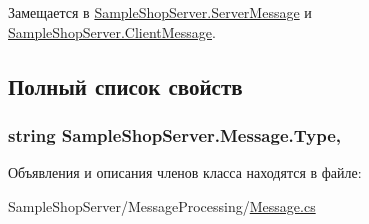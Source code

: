 Замещается в \hyperlink{class_sample_shop_server_1_1_server_message_ae5eb28a2450cb004d32d8c55c6861745}{Sample\+Shop\+Server.\+Server\+Message} и \hyperlink{class_sample_shop_server_1_1_client_message_ad2e08f5cada54ed32770860c69b78940}{Sample\+Shop\+Server.\+Client\+Message}.



\subsection{Полный список свойств}
\hypertarget{class_sample_shop_server_1_1_message_a61fbbb686131d338b98a47eb473ae8ce}{}
\subsubsection[{Type}]{\setlength{\rightskip}{0pt plus 5cm}string Sample\+Shop\+Server.\+Message.\+Type\hspace{0.3cm}{\ttfamily [get]}, {\ttfamily [set]}}\label{class_sample_shop_server_1_1_message_a61fbbb686131d338b98a47eb473ae8ce}


Объявления и описания членов класса находятся в файле\+:\begin{DoxyCompactItemize}
\item 
Sample\+Shop\+Server/\+Message\+Processing/\hyperlink{_message_8cs}{Message.\+cs}\end{DoxyCompactItemize}
